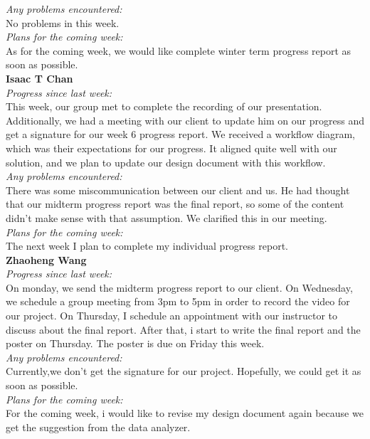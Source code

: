 \noindent\textit{Any problems encountered:}\\
No problems in this week.\\

\noindent\textit{Plans for the coming week:}\\
As for the coming week, we would like complete winter term progress report as soon as possible.\\

\noindent\textbf{Isaac T Chan}\\
\noindent\textit{Progress since last week:}\\
This week, our group met to complete the recording of our presentation. Additionally, we had a meeting with our client to update him on our progress and get a signature for our week 6 progress report. We received a workflow diagram, which was their expectations for our progress. It aligned quite well with our solution, and we plan to update our design document with this workflow.\\

\noindent\textit{Any problems encountered:}\\
There was some miscommunication between our client and us. He had thought that our midterm progress report was the final report, so some of the content didn't make sense with that assumption. We clarified this in our meeting.\\

\noindent\textit{Plans for the coming week:}\\
The next week I plan to complete my individual progress report.\\

\noindent\textbf{Zhaoheng Wang}\\
\noindent\textit{Progress since last week:}\\
On monday, we send the midterm progress report to our client. On Wednesday, we schedule a group meeting from 3pm to 5pm in order to record the video for our project. On Thursday, I schedule an appointment with our instructor to discuss about the final report. After that, i start to write the final report and the poster on Thursday. The poster is due on Friday this week.\\

\noindent\textit{Any problems encountered:}\\
Currently,we don't get the signature for our project. Hopefully, we could get it as soon as possible.\\

\noindent\textit{Plans for the coming week:}\\
For the coming week, i would like to revise my design document again because we get the suggestion from the data analyzer.